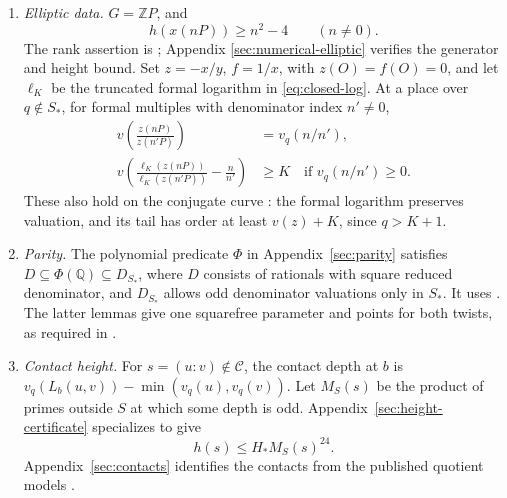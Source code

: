 \documentclass[11pt]{article}
\theoremstyle{definition}
\newcommand{\Q}{\mathbb Q}\newcommand{\Z}{\mathbb Z}
\begin{document}
\begin{enumerate}[label=\textbf{(I\arabic*)},leftmargin=*,itemsep=4pt]
\item \emph{Elliptic data.} \(G=\Z P\), and
\begin{equation}\label{eq:canonical}
                    h(x(nP))\ge n^2-4\qquad(n\ne0).
\end{equation}
The rank assertion is \cite[Proposition 2.1]{H10}; Appendix
\ref{sec:numerical-elliptic} verifies the generator and height bound.
Set \(z=-x/y\), \(f=1/x\), with \(z(O)=f(O)=0\), and
let \(\ell_K\) be the truncated formal logarithm in
\eqref{eq:closed-log}. At a place over \(q\notin S_*\), for
formal multiples with denominator index \(n'\ne0\),
\begin{align}
 v\!\left(\frac{z(nP)}{z(n'P)}\right)&=v_q(n/n'),\label{eq:formal-ratio}\\
 v\!\left(\frac{\ell_K(z(nP))}{\ell_K(z(n'P))}-\frac n{n'}\right)
 &\ge K\quad\text{if }v_q(n/n')\ge0.\label{eq:formal-log}
\end{align}
These also hold on the conjugate curve \cite[Proposition 2.2 and
Section 5]{H10}: the formal logarithm preserves valuation, and its
tail has order at least \(v(z)+K\), since \(q>K+1\).

\item \emph{Parity.} The polynomial predicate \(\Phi\) in
Appendix~\ref{sec:parity} satisfies
\(D\subseteq\Phi(\Q)\subseteq D_{S_*}\), where \(D\) consists
of rationals with square reduced denominator, and \(D_{S_*}\)
allows odd denominator valuations only in \(S_*\).
It uses \cite[Proposition 2.8; Lemmas 3.4 and 3.6, with the local
conditions of Lemma 3.2]{H10}. The latter lemmas give one squarefree
parameter and points for both twists, as required in
\cite[Arithmetic Input 2.3]{Conant}.

\item \emph{Contact height.} For \(s=(u:v)\notin\mathcal C\),
the contact depth at \(b\) is
\(v_q(L_b(u,v))-\min(v_q(u),v_q(v))\).
Let \(M_S(s)\) be the product of primes outside \(S\) at which
some depth is odd. Appendix~\ref{sec:height-certificate} specializes
\cite[Theorem 2.4]{H10} to give
\begin{equation}\label{eq:height}
                      h(s)\le H_*M_S(s)^{24}.
\end{equation}
Appendix~\ref{sec:contacts} identifies the contacts from the
published quotient models \cite{PadurariuSaia}.


\end{enumerate}
\end{document}
